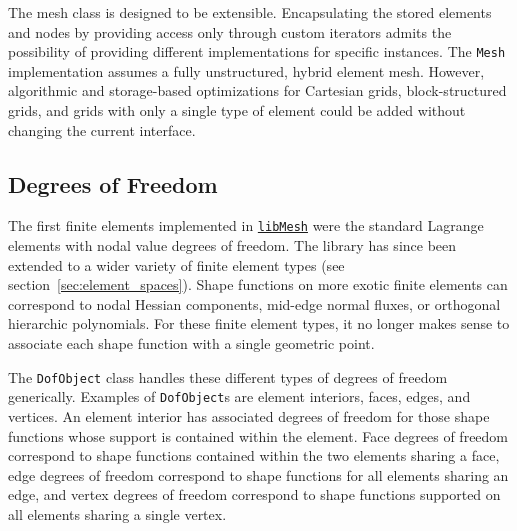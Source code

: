 \documentclass[global,twocolumn,final]{svjour}
\newcommand{\libMesh}{\href{http://libmesh.sourceforge.net}{\texttt{lib\-Mesh}}}
\begin{document}
The mesh class is designed to be extensible.  Encapsulating
the stored elements and nodes by providing access only through
custom iterators admits the possibility of providing different
implementations for specific instances.  The \texttt{Mesh}
implementation assumes a fully unstructured, hybrid element mesh. 
However,
algorithmic and storage-based optimizations for Cartesian grids,
block-structured grids, and grids with only a single type of element
could be added without changing the current interface.


\subsection{Degrees of Freedom\label{sec:dof_distribution}}
The first finite elements implemented in \libMesh{} were the standard
Lagrange elements with nodal value degrees of freedom.  The library
has since been extended to a wider variety of finite element types
(see section~\ref{sec:element_spaces}).  Shape functions on more
exotic finite elements can correspond to nodal Hessian components,
mid-edge normal fluxes, or orthogonal hierarchic polynomials.
For these finite element types, it no longer makes sense to associate
each shape function with a single geometric point.

The \texttt{DofObject} class handles these different types of 
degrees of freedom generically.  Examples of \texttt{DofObject}s
are element interiors, faces, edges, and vertices.  An element interior
has associated degrees of freedom for those shape functions whose
support is contained within the element.  Face degrees of
freedom correspond to shape functions contained within the two
elements sharing a face, edge degrees of freedom correspond to shape
functions for all elements sharing an edge, and vertex degrees of
freedom correspond to shape functions supported on all elements
sharing a single vertex.
\end{document}
